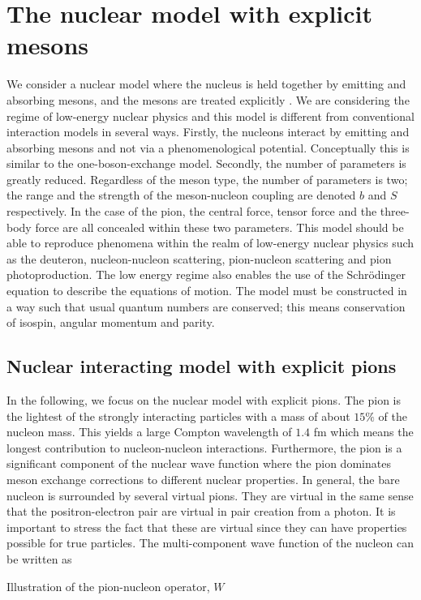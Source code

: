 \chapter{The nuclear model with explicit mesons}\label{Decsofmodel}

We consider a nuclear model where the nucleus is held together by emitting and absorbing mesons, and the mesons are treated explicitly \cite[]{Mesons}. We are considering the regime of low-energy nuclear physics and this model is different from conventional interaction models in several ways. Firstly, the nucleons interact by emitting and absorbing mesons and not via a phenomenological potential. Conceptually this is similar to the one-boson-exchange model. Secondly, the number of parameters is greatly reduced. Regardless of the meson type, the number of parameters is two; the range and the strength of the meson-nucleon coupling are denoted $b$ and $S$ respectively. In the case of the pion, the central force, tensor force and the three-body force are all concealed within these two parameters. This model should be able to reproduce phenomena within the realm of low-energy nuclear physics such as the deuteron, nucleon-nucleon scattering, pion-nucleon scattering and pion photoproduction. The low energy regime also enables the use of the Schrödinger equation to describe the equations of motion. The model must be constructed in a way such that usual quantum numbers are conserved; this means conservation of isospin, angular momentum and parity. 

\section{Nuclear interacting model with explicit pions }\label{sec:model}

In the following, we focus on the nuclear model with explicit pions. The pion is the lightest of the strongly interacting particles with a mass of about $15\%$ of the nucleon mass. This yields a large Compton wavelength of $1.4$ fm which means the longest contribution to nucleon-nucleon interactions. Furthermore, the pion is a significant component of the nuclear wave function where the pion dominates meson exchange corrections to different nuclear properties. In general, the bare nucleon is surrounded by several virtual pions. 
They are virtual in the same sense that the positron-electron pair are virtual in pair creation from a photon. It is important to stress the fact that these are virtual since they can have properties possible for true particles. The multi-component wave function of the nucleon can be written as
\begin{marginfigure}
	\centering
	
	\caption{Illustration of the pion-nucleon operator, $W$}
	\label{fig:superposition}
\end{marginfigure}

